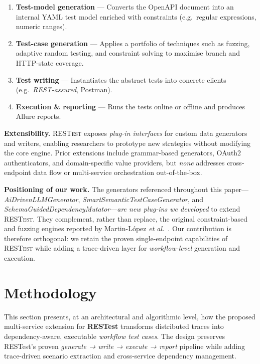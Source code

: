 \begin{enumerate}[leftmargin=*,label=\arabic*)]
  \item \textbf{Test-model generation} — Converts the OpenAPI document
        into an internal YAML test model enriched with
        constraints (e.g.\ regular expressions, numeric ranges).
  \item \textbf{Test-case generation} — Applies a portfolio of
        techniques such as fuzzing, adaptive random testing, and
        constraint solving to maximise branch and HTTP-state coverage.
  \item \textbf{Test writing} — Instantiates the abstract tests into
        concrete clients (e.g.\ \textit{REST-assured}, Postman).
  \item \textbf{Execution \& reporting} — Runs the tests online or
        offline and produces Allure reports.
\end{enumerate}

\textbf{Extensibility.}  
\textsc{RESTest} exposes \emph{plug-in interfaces} for custom data
generators and writers, enabling researchers to prototype new
strategies without modifying the core engine.  
Prior extensions include grammar-based generators, OAuth2
authenticators, and domain-specific value providers, but \emph{none}
addresses cross-endpoint data flow or multi-service orchestration
out-of-the-box.

\textbf{Positioning of our work.}  
The generators referenced throughout this paper—
\textit{AiDrivenLLMGenerator}, \textit{SmartSemanticTestCaseGenerator},
and \textit{SchemaGuidedDependencyMutator}—\emph{are new plug-ins we
developed} to extend \textsc{RESTest}.  
They complement, rather than replace, the original
constraint-based and fuzzing engines reported by
Martin-López \emph{et al.}~\cite{martin2019restest}.  
Our contribution is therefore orthogonal: we retain the proven
single-endpoint capabilities of \textsc{RESTest} while adding a
trace-driven layer for \emph{workflow-level} generation and execution.


\section{Methodology}\label{sec:method}
This section presents, at an architectural and algorithmic level, how the proposed multi-service extension for \textbf{RESTest} transforms distributed traces into dependency-aware, executable \emph{workflow test cases}.  The design preserves RESTest’s proven \textit{generate → write → execute → report} pipeline while adding trace-driven scenario extraction and cross-service dependency management.

